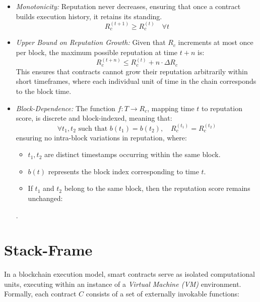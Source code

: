 \documentclass{article}
\begin{document}
\begin{itemize}
    \item \textit{Monotonicity:} Reputation never decreases, ensuring that once a contract builds execution history, it retains its standing.
    \begin{equation}
        R_c^{(t+1)} \geq R_c^{(t)} \quad \forall t
    \end{equation}
    
    \item \textit{Upper Bound on Reputation Growth:} Given that \( R_c \) increments at most once per block, the maximum possible reputation at time \( t+n \) is:
    \begin{equation}
        R_c^{(t+n)} \leq R_c^{(t)} + n \cdot \Delta R_c
    \end{equation}
    This ensures that contracts cannot grow their reputation arbitrarily within short timeframes, where each individual unit of time in the chain corresponds to the block time.


    \item \textit{Block-Dependence:} The function \( f: T \to R_c \), mapping time \( t \) to reputation score, is discrete and block-indexed, meaning that:
    \begin{equation}
        \forall t_1, t_2 \text{ such that } b(t_1) = b(t_2), \quad R_c^{(t_1)} = R_c^{(t_2)}
    \end{equation}
    ensuring no intra-block variations in reputation, where:  
    \begin{itemize}
        \item \( t_1, t_2 \) are distinct timestamps occurring within the same block.
        \item \( b(t) \) represents the block index corresponding to time \( t \).
        \item If \( t_1 \) and \( t_2 \) belong to the same block, then the reputation score remains unchanged:  
    \end{itemize}.
\end{itemize}

\section{Stack-Frame}

In a blockchain execution model, smart contracts serve as isolated computational units, executing within an instance of a \textit{Virtual Machine (VM)} environment. Formally, each contract \( C \) consists of a set of externally invokable functions:
\end{document}
